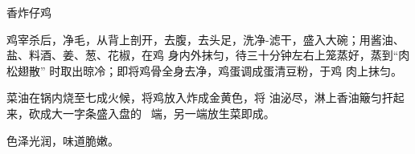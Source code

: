 \begin{recipe}[喇嘛仔鸡]{香炸仔鸡}

\ingredients


\cooking

\step 鸡宰杀后，净毛，从背上剖开，去腹，去头足，洗净-滤干，盛入大碗；用酱油、盐、料酒、姜、葱、花椒，在鸡 身内外抹匀，待三十分钟左右上笼蒸好，蒸到“肉松翅散” 时取出晾冷；即将鸡骨全身去净，鸡蛋调成蛋清豆粉，于鸡 肉上抹匀。

\step 菜油在锅内烧至七成火候，将鸡放入炸成金黄色，将 油泌尽，淋上香油簸匀扞起来，砍成大一字条盛入盘的~ 端，另一端放生菜即成。

\notes

色泽光润，味道脆嫩。

\end{recipe}

